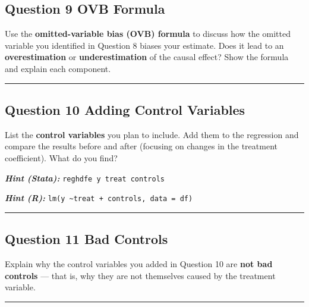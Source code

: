 \documentclass[paper=a4, fontsize=11pt]{scrartcl}
\newcommand{\horrule}[1]{\rule{\linewidth}{#1}}
\begin{document}
\subsection*{Question 9 \quad OVB Formula}

Use the \textbf{omitted-variable bias (OVB) formula} to discuss how the omitted variable you identified in Question 8 biases your estimate. Does it lead to an \textbf{overestimation} or \textbf{underestimation} of the causal effect? Show the formula and explain each component.

\bigskip\horrule{0.4pt}\bigskip


\subsection*{Question 10 \quad Adding Control Variables}

List the \textbf{control variables} you plan to include. Add them to the regression and compare the results before and after (focusing on changes in the treatment coefficient). What do you find?

\medskip
\textit{\textbf{Hint (Stata):}} \texttt{reghdfe  y treat controls}

\textit{\textbf{Hint (R):}} \texttt{lm(y \textasciitilde treat + controls, data = df)}

\bigskip\horrule{0.4pt}\bigskip


\subsection*{Question 11 \quad Bad Controls}

Explain why the control variables you added in Question 10 are \textbf{not bad controls} --- that is, why they are not themselves caused by the treatment variable.

\bigskip\horrule{0.4pt}\bigskip

\end{document}
